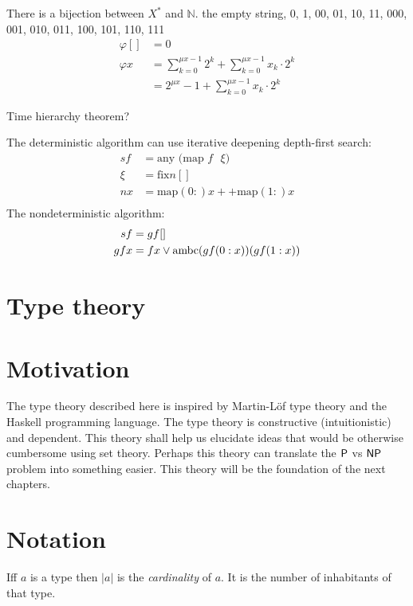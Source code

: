 There is a bijection between $X^*$ and $\mathbb N$.
the empty string, 0, 1, 00, 01, 10, 11, 000, 001, 010, 011, 100, 101, 110, 111
\begin{align}
    \varphi [] &= 0
  \\ \varphi x &= \sum_{k=0}^{\mu x - 1} 2^k + \sum_{k=0}^{\mu x - 1} x_k \cdot 2^k
            \\ &= 2^{\mu x} - 1 + \sum_{k=0}^{\mu x - 1} x_k \cdot 2^k
\end{align}

Time hierarchy theorem?

The deterministic algorithm can use iterative deepening depth-first search:
\begin{align}
    sf &= \text{any $($map $f$ $\xi)$}
    \\
    \xi &= \text{fix} n []
    \\
    nx &= \text{map} (0:) x ++ \text{map} (1:) x
    \\
\end{align}
The nondeterministic algorithm:
\begin{align}
    sf &= gf[]
    \\
    gfx &= fx \vee \operatorname{ambc} (gf(0:x)) (gf(1:x))
\end{align}

\section{Type theory}

\section{Motivation}

The type theory described here is inspired by
Martin-L\"of type theory
and the Haskell programming language.
The type theory is constructive (intuitionistic) and dependent.
This theory shall help us elucidate ideas that
would be otherwise cumbersome using set theory.
Perhaps this theory can translate the $\mathsf{P}$ vs $\mathsf{NP}$ problem
into something easier.
This theory will be the foundation
of the next chapters.

\section{Notation}

Iff \(a\) is a type then \(|a|\) is the \emph{cardinality} of \(a\).
It is the number of inhabitants of that type.


